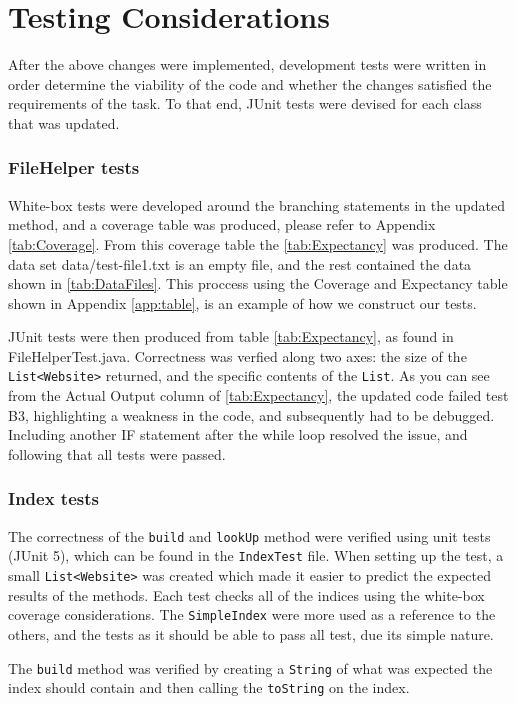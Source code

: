 \section{Testing Considerations}
After the above changes were implemented, development tests were written in order determine the viability of the code and whether the changes satisfied the requirements of the task. To that end, JUnit tests were devised for each class that was updated.

\subsubsection{FileHelper tests}
White-box tests were developed around the branching statements in the updated method, and a coverage table was produced,
please refer to Appendix \ref{tab:Coverage}. From this coverage table the  \ref{tab:Expectancy} was produced. The data
set data/test-file1.txt is an empty file, and the rest contained the data shown in \ref{tab:DataFiles}. This proccess
using the Coverage and Expectancy table shown in Appendix \ref{app:table}, is an example of how we construct our tests.

JUnit tests were then produced from table \ref{tab:Expectancy}, as found in FileHelperTest.java. Correctness was verfied along two axes: the size of
the {\tt List<Website>} returned, and the specific contents of the {\tt List}. As you can see from the Actual Output column of \ref{tab:Expectancy},
the updated code failed test B3, highlighting a weakness in the code, and subsequently had to be debugged. Including another IF statement after
the while loop resolved the issue, and following that all tests were passed.

\subsubsection{Index tests}
The correctness of the {\tt build} and {\tt lookUp} method were verified using unit tests (JUnit 5), which can be found in the {\tt IndexTest} file.
When setting up the test, a small {\tt List<Website>} was created which made it easier to predict the expected results of the methods. Each test
checks all of the indices using the white-box coverage considerations. The {\tt SimpleIndex} were more used as a reference to the others, and the
tests as it should be able to pass all test, due its simple nature.

The {\tt build} method was verified by creating a {\tt String} of what was expected the index should contain and then calling the {\tt toString} on
the index.

